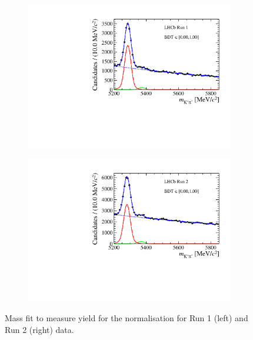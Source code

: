 {{\begin{figure}[htbp]
    \centering
  \begin{subfigure}[b]{0.48\textwidth}
        \includegraphics[width=  \textwidth]{./Figs/BFAnalysis/Bd2KPi_mass_RunI_BDTbinNone.pdf}
    \end{subfigure}
    \begin{subfigure}[b]{0.48\textwidth}
       \includegraphics[width=\textwidth]{./Figs/BFAnalysis/Bd2KPi_mass_RunII_BDTbinNone.pdf}
   \end{subfigure}
    \caption{Mass fit to measure \bdkpi yield for the normalisation for Run 1 (left) and Run 2 (right) data. }
    \label{fig:Bdkpiyield}
\end{figure}



}}
